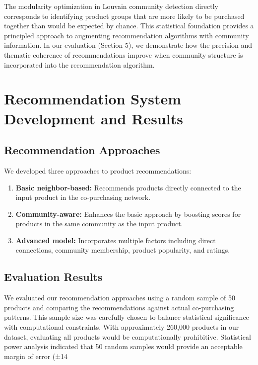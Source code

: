 \documentclass[conference]{IEEEtran}
\begin{document}
The modularity optimization in Louvain community detection directly corresponds to identifying product groups that are more likely to be purchased together than would be expected by chance. This statistical foundation provides a principled approach to augmenting recommendation algorithms with community information. In our evaluation (Section 5), we demonstrate how the precision and thematic coherence of recommendations improve when community structure is incorporated into the recommendation algorithm.

\section{Recommendation System Development and Results}

\subsection{Recommendation Approaches}
We developed three approaches to product recommendations:

\begin{enumerate}
    \item \textbf{Basic neighbor-based:} Recommends products directly connected to the input product in the co-purchasing network.
    
    \item \textbf{Community-aware:} Enhances the basic approach by boosting scores for products in the same community as the input product.
    
    \item \textbf{Advanced model:} Incorporates multiple factors including direct connections, community membership, product popularity, and ratings.
\end{enumerate}

\subsection{Evaluation Results}
We evaluated our recommendation approaches using a random sample of 50 products and comparing the recommendations against actual co-purchasing patterns. This sample size was carefully chosen to balance statistical significance with computational constraints. With approximately 260,000 products in our dataset, evaluating all products would be computationally prohibitive. Statistical power analysis indicated that 50 random samples would provide an acceptable margin of error (±14%
\end{document}
